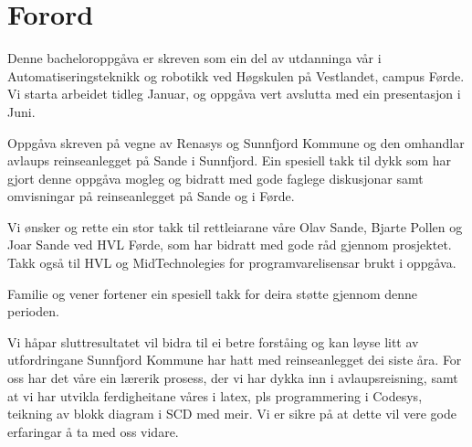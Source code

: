 \chapter{Forord}
\thispagestyle{romanpages}

Denne bacheloroppgåva er skreven som ein del av utdanninga vår i Automatiseringsteknikk og robotikk ved Høgskulen på Vestlandet, campus Førde.
Vi starta arbeidet tidleg Januar, og oppgåva vert avslutta med ein presentasjon i Juni.

Oppgåva skreven på vegne av \gls{Renasys}\citep{Renasys} og \gls{Sunnfjord Kommune}\citep{SunnfjordKommune} og den omhandlar 
avlaups reinseanlegget på Sande i Sunnfjord. 
Ein spesiell takk til dykk som har gjort denne oppgåva mogleg og
bidratt med gode faglege diskusjonar samt omvisningar på reinseanlegget på Sande og i Førde.

Vi ønsker og rette ein stor takk til rettleiarane våre Olav Sande, Bjarte Pollen og Joar Sande ved HVL Førde, som har bidratt med gode råd gjennom prosjektet.
Takk også til HVL og MidTechnolegies for programvarelisensar brukt i oppgåva.

Familie og vener fortener ein spesiell takk for deira støtte gjennom denne perioden.

Vi håpar sluttresultatet vil bidra til ei betre forståing og kan løyse litt av utfordringane Sunnfjord Kommune har hatt med reinseanlegget dei siste åra.
For oss har det våre ein lærerik prosess, der vi har dykka inn i avlaupsreisning, samt at vi har utvikla ferdigheitane våres i \gls{latex}, 
pls programmering i \gls{Codesys}, teikning av blokk diagram i SCD med meir. Vi er sikre på at dette vil vere gode erfaringar å ta med oss vidare.
